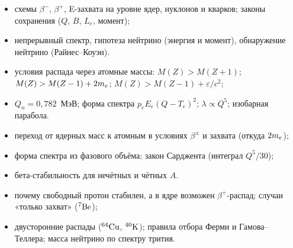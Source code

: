 \begin{examcheck}
\begin{itemize}
 \item схемы $\beta^-$, $\beta^+$, E-захвата на уровне ядер, нуклонов и кварков; законы сохранения ($Q$, $B$, $L_e$, момент);
 \item непрерывный спектр, гипотеза нейтрино (энергия и момент), обнаружение нейтрино (Райнес--Коуэн).
\end{itemize}
\begin{itemize}
 \item условия распада через атомные массы: $M(Z)>M(Z+1)$; $M(Z)>M(Z-1)+2\mel$; $M(Z)>M(Z-1)+\varepsilon/c^2$;
 \item $Q_n=0{,}782$~МэВ; форма спектра $p_eE_e(Q-T_e)^2$; $\lambda\propto Q^5$; изобарная парабола.
\end{itemize}
\begin{itemize}
 \item переход от ядерных масс к атомным в условиях $\beta^\pm$ и захвата (откуда $2\mel$);
 \item форма спектра из фазового объёма; закон Сарджента (интеграл $Q^5/30$);
 \item бета-стабильность для нечётных и чётных $A$.
\end{itemize}
\begin{itemize}
 \item почему свободный протон стабилен, а в ядре возможен $\beta^+$-распад; случаи «только захват» ($\nucl{Be}{7}$);
 \item двусторонние распады ($\nucl{Cu}{64}$, $\nucl{K}{40}$); правила отбора Ферми и Гамова--Теллера; масса нейтрино по спектру трития.
\end{itemize}
\end{examcheck}
